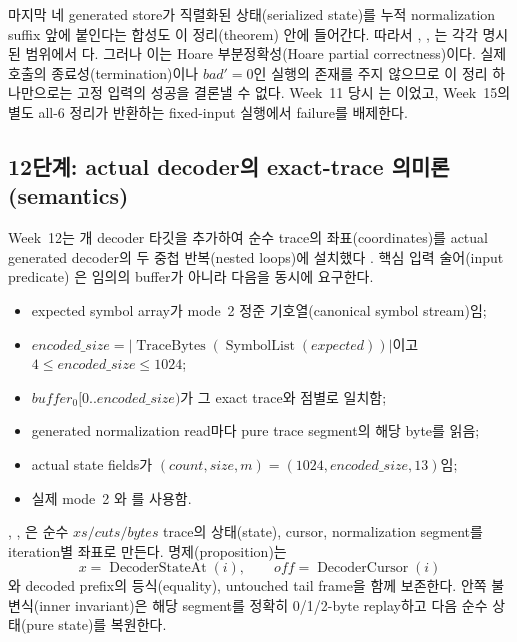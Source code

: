 마지막 네 generated store가 직렬화된 상태(serialized state)를 누적
normalization suffix 앞에 붙인다는 합성도 이 정리(theorem) 안에 들어간다.
따라서 ,
,
는 각각 명시된 범위에서 \statusproved 다.
그러나 이는 Hoare 부분정확성(Hoare partial correctness)이다. 실제 호출의
종료성(termination)이나 \(bad'=0\)인 실행의 존재를 주지 않으므로
이 정리 하나만으로는 고정 입력의 성공을 결론낼 수 없다. Week~11 당시
는 \statuspartial 이었고, Week~15의
별도 all-6 정리가 반환하는 fixed-input 실행에서 failure를 배제한다.

\subsection{12단계: actual decoder의 exact-trace 의미론(semantics)}

Week~12는 \WeekTwelveTargetCount 개 decoder 타깃을 추가하여 순수 trace의
좌표(coordinates)를 actual generated decoder의 두 중첩 반복(nested loops)에
설치했다 \cite{week12-report,rans-decoder-invariant}. 핵심 입력 술어(input predicate)
은 임의의 buffer가 아니라 다음을
동시에 요구한다.

\begin{itemize}
  \item expected symbol array가 mode~2 정준 기호열(canonical symbol stream)임;
  \item \(encoded\_size=|\operatorname{TraceBytes}
        (\operatorname{SymbolList}(expected))|\)이고 \(4\le encoded\_size\le1024\);
  \item \(buffer_0[0..encoded\_size)\)가 그 exact trace와 점별로 일치함;
  \item generated normalization read마다 pure trace segment의 해당 byte를 읽음;
  \item actual state fields가 \((count,size,m)=(1024,encoded\_size,13)\)임;
  \item 실제 mode~2 와 를 사용함.
\end{itemize}

\begin{verified}
, ,
은 순수 \(xs/cuts/bytes\) trace의 상태(state),
cursor, normalization segment를 iteration별 좌표로 만든다.
 명제(proposition)는
\[
  x=\operatorname{DecoderStateAt}(i),\qquad
  off=\operatorname{DecoderCursor}(i)
\]
와 decoded prefix의 등식(equality), untouched tail frame을 함께 보존한다.
안쪽 불변식(inner invariant)은 해당 segment를 정확히 0/1/2-byte replay하고 다음
순수 상태(pure state)를 복원한다.
\end{verified}

